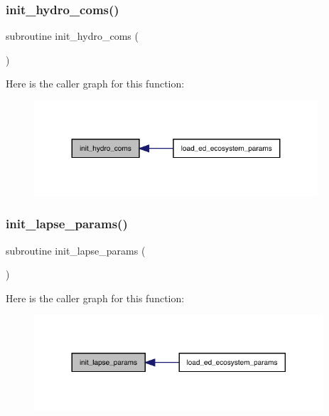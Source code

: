 \subsubsection{\texorpdfstring{init\+\_\+hydro\+\_\+coms()}{init\_hydro\_coms()}}
{\footnotesize\ttfamily subroutine init\+\_\+hydro\+\_\+coms (\begin{DoxyParamCaption}{ }\end{DoxyParamCaption})}

Here is the caller graph for this function\+:
\nopagebreak
\begin{figure}[H]
\begin{center}
\leavevmode
\includegraphics[width=299pt]{ed__params_8f90_a388838ad10e11c3962aefd4118e3c16f_icgraph}
\end{center}
\end{figure}
\mbox{\label{ed__params_8f90_a9ad3fc95dae56221cb17769b1a51b852}} 
\subsubsection{\texorpdfstring{init\+\_\+lapse\+\_\+params()}{init\_lapse\_params()}}
{\footnotesize\ttfamily subroutine init\+\_\+lapse\+\_\+params (\begin{DoxyParamCaption}{ }\end{DoxyParamCaption})}

Here is the caller graph for this function\+:
\nopagebreak
\begin{figure}[H]
\begin{center}
\leavevmode
\includegraphics[width=305pt]{ed__params_8f90_a9ad3fc95dae56221cb17769b1a51b852_icgraph}
\end{center}
\end{figure}
\mbox{\label{ed__params_8f90_a82e540d1abc17b344e25567cce30f2fc}} 
